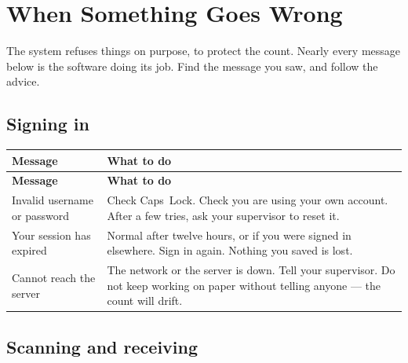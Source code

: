\chapter{When Something Goes Wrong}
\label{ch:trouble}

The system refuses things on purpose, to protect the count. Nearly every message
below is the software doing its job. Find the message you saw, and follow the
advice.

\section{Signing in}

\begin{longtable}{@{}p{52mm}p{86mm}@{}}
\toprule
\textbf{Message} & \textbf{What to do} \\
\midrule
\endfirsthead
\toprule
\textbf{Message} & \textbf{What to do} \\
\midrule
\endhead
\bottomrule
\endfoot

Invalid username or password &
  Check Caps~Lock. Check you are using your own account. After a few tries, ask
  your supervisor to reset it. \\

Your session has expired &
  Normal after twelve hours, or if you were signed in elsewhere. Sign in again.
  Nothing you saved is lost. \\

Cannot reach the server &
  The network or the server is down. Tell your supervisor. Do not keep working on
  paper without telling anyone --- the count will drift. \\

\end{longtable}

\section{Scanning and receiving}

